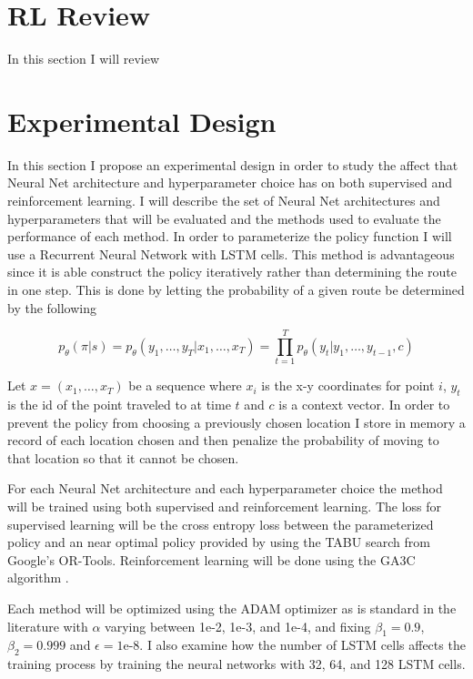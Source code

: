 \documentclass[12pt]{article}
\begin{document}
\section{RL Review}

In this section I will review




\section{Experimental Design}
In this section I propose an experimental design in order to study the affect that Neural Net architecture and hyperparameter choice has on both supervised and reinforcement learning. I will describe the set of Neural Net architectures and hyperparameters that will be evaluated and the methods used to evaluate the performance of each method. In order to parameterize the policy function I will use a Recurrent Neural Network with LSTM cells. This method is advantageous since it is able construct the policy iteratively rather than determining the route in one step. This is done by letting the probability of a given route be determined by the following

\begin{equation*}
  p_\theta(\pi|s)=p_\theta(y_1,\dots,y_T |x_1,\dots, x_T)=\prod_{t=1}^{T}p_\theta(y_t|y_1,\dots,y_{t-1},c)
\end{equation*}

Let $x=(x_1,\dots,x_T)$ be a sequence where $x_i$ is the x-y coordinates for point $i$, $y_t$ is the id of the point traveled to at time $t$ and $c$ is a context vector. In order to prevent the policy from choosing a previously chosen location I store in memory a record of each location chosen and then penalize the probability of moving to that location so that it cannot be chosen.

For each Neural Net architecture and each hyperparameter choice the method will be trained using both supervised and reinforcement learning. The loss for supervised learning will be the cross entropy loss between the parameterized policy and an near optimal policy provided by using the TABU search from Google's OR-Tools. Reinforcement learning will be done using the GA3C algorithm \citet{2016_ga3c}.

Each method will be optimized using the ADAM optimizer as is standard in the literature with $\alpha$ varying between 1e-2, 1e-3, and 1e-4, and fixing $\beta_1=0.9$, $\beta_2=0.999$ and $\epsilon=\text{1e-8}$. I also examine how the number of LSTM cells affects the training process by training the neural networks with 32, 64, and 128 LSTM cells.
\end{document}
